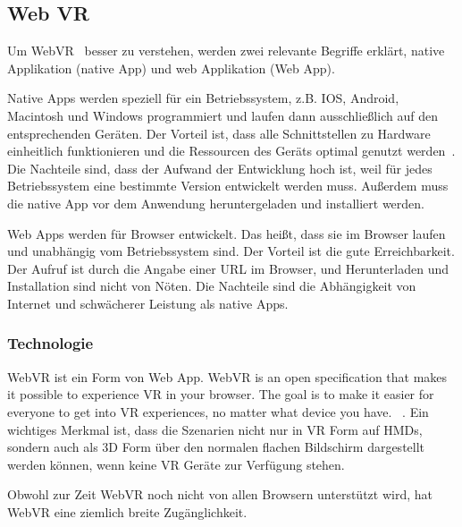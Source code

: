  \subsection{Web VR}
 Um \glqq WebVR \grqq\ besser zu verstehen, werden zwei relevante Begriffe erklärt, native Applikation (native App) und web Applikation (Web App).
 
 Native Apps werden speziell für ein Betriebssystem, z.B. IOS, Android, Macintosh und Windows programmiert und laufen dann ausschließlich auf den entsprechenden Geräten. Der Vorteil ist, \glqq dass alle Schnittstellen zu Hardware einheitlich funktionieren und die Ressourcen des Geräts optimal genutzt werden\grqq\ \citep{22}. Die Nachteile sind, dass der Aufwand der Entwicklung hoch ist, weil für jedes Betriebssystem eine bestimmte Version entwickelt werden muss. Außerdem muss die native App vor dem Anwendung heruntergeladen und installiert werden.
 
 Web Apps werden für Browser entwickelt. Das heißt, dass sie im Browser laufen und unabhängig vom Betriebssystem sind. Der Vorteil ist die gute Erreichbarkeit. Der Aufruf ist durch die Angabe einer URL im Browser, und Herunterladen und Installation sind nicht von Nöten. Die Nachteile sind die Abhängigkeit von Internet und schwächerer Leistung als native Apps.
 
  \subsubsection{Technologie}
 WebVR ist ein Form von Web App. \glqq WebVR is an open specification that makes it possible to experience VR in your browser. The goal is to make it easier for everyone to get into VR experiences, no matter what device you have. \grqq\ \citep{21}. Ein wichtiges Merkmal ist, dass die Szenarien nicht nur in VR Form auf HMDs, sondern auch als 3D Form über den normalen flachen Bildschirm dargestellt werden können, wenn keine VR Geräte zur Verfügung stehen.
 
 Obwohl zur Zeit WebVR noch nicht von allen Browsern unterstützt wird, hat WebVR eine ziemlich breite Zugänglichkeit.
 
